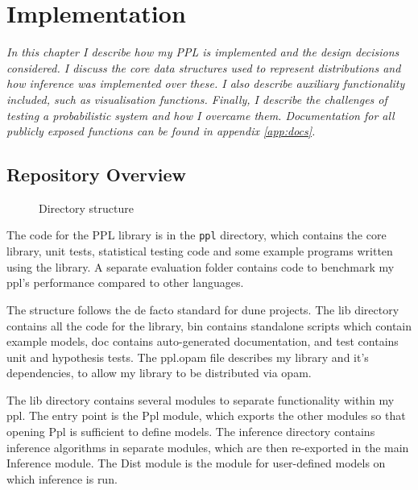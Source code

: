 \chapter{Implementation}
\textit{In this chapter I describe how my PPL is implemented and the design decisions considered. I discuss the core data structures used to represent distributions and how inference was implemented over these. I also describe auxiliary functionality included, such as visualisation functions. Finally, I describe the challenges of testing a probabilistic system and how I overcame them. Documentation for all publicly exposed functions can be found in appendix \ref{app:docs}.}

\section{Repository Overview}

\begin{figure}
	\caption{Directory structure}
	\label{fig:dirs}
\end{figure}

The code for the PPL library is in the \texttt{ppl} directory, which contains the core library, unit tests, statistical testing code and some example programs written using the library. A separate evaluation folder contains code to benchmark my ppl's performance compared to other languages.

The structure follows the de facto standard for dune projects. The lib directory contains all the code for the library, bin contains standalone scripts which contain example models, doc contains auto-generated documentation, and test contains unit and hypothesis tests. The ppl.opam file describes my library and it's dependencies, to allow my library to be distributed via opam.

The lib directory contains several modules to separate functionality within my ppl. The entry point is the Ppl module, which exports the other modules so that opening Ppl is sufficient to define models. The inference directory contains inference algorithms in separate modules, which are then re-exported in the main Inference module. The Dist module is the module for user-defined models on which inference is run. 

